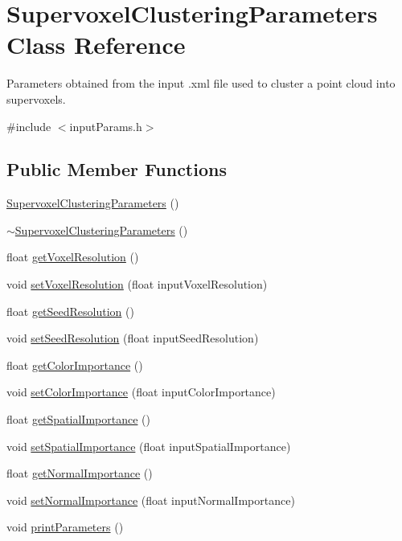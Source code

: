 \hypertarget{classSupervoxelClusteringParameters}{\section{Supervoxel\-Clustering\-Parameters Class Reference}
\label{classSupervoxelClusteringParameters}
}


Parameters obtained from the input .xml file used to cluster a point cloud into supervoxels.  




{\ttfamily \#include $<$input\-Params.\-h$>$}

\subsection*{Public Member Functions}
\begin{DoxyCompactItemize}
\item 
\hyperlink{classSupervoxelClusteringParameters_a7df680fb593203e96b046bb576bfab47}{Supervoxel\-Clustering\-Parameters} ()
\item 
\hyperlink{classSupervoxelClusteringParameters_ac97cab0324363aeb7f2c8935911b8a8b}{$\sim$\-Supervoxel\-Clustering\-Parameters} ()
\item 
float \hyperlink{classSupervoxelClusteringParameters_a1692c295fcb62be0df580d56c2bc6293}{get\-Voxel\-Resolution} ()
\item 
void \hyperlink{classSupervoxelClusteringParameters_a7434b088934aa3c707ec524d8ef0f7ca}{set\-Voxel\-Resolution} (float input\-Voxel\-Resolution)
\item 
float \hyperlink{classSupervoxelClusteringParameters_a373fa7ca3625affcfb27ce4a5e37e727}{get\-Seed\-Resolution} ()
\item 
void \hyperlink{classSupervoxelClusteringParameters_a7dc6bee23664efe56f3f2191c706da53}{set\-Seed\-Resolution} (float input\-Seed\-Resolution)
\item 
float \hyperlink{classSupervoxelClusteringParameters_a8e51b8fbd0b132dd692ff23a9fc0f3fb}{get\-Color\-Importance} ()
\item 
void \hyperlink{classSupervoxelClusteringParameters_afd373e8bac6badd22c55fcf64ad55781}{set\-Color\-Importance} (float input\-Color\-Importance)
\item 
float \hyperlink{classSupervoxelClusteringParameters_acafc23d4fb8a84096103f6b06be68430}{get\-Spatial\-Importance} ()
\item 
void \hyperlink{classSupervoxelClusteringParameters_a252ac65811e98e0de277785498ca59a0}{set\-Spatial\-Importance} (float input\-Spatial\-Importance)
\item 
float \hyperlink{classSupervoxelClusteringParameters_a4fd38f7285516f952d01240bcfb35e82}{get\-Normal\-Importance} ()
\item 
void \hyperlink{classSupervoxelClusteringParameters_a886165a54c699c198938af21d26f1c9b}{set\-Normal\-Importance} (float input\-Normal\-Importance)
\item 
void \hyperlink{classSupervoxelClusteringParameters_a8f7e597b0775715c3463b5b92a26eed8}{print\-Parameters} ()
\end{DoxyCompactItemize}
